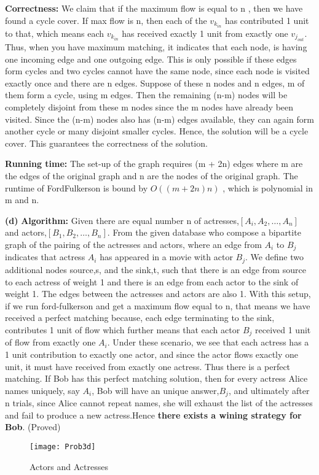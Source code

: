 \documentclass{article}
\renewcommand\part[1]{\vspace{.10in}\textbf{(#1)}}
\newcommand\algo{\vspace{.10in}\textbf{Algorithm: }}
\newcommand\correctness{\vspace{.10in}\textbf{Correctness: }}
\newcommand\runtime{\vspace{.10in}\textbf{Running time: }}
\begin{document}
  \correctness We claim that if the maximum flow is equal to n , then we have found a cycle cover. If max flow is n, then each of the $v_{k_{in}}$ has contributed 1 unit to that, which means each $v_{k_{in}}$ has received exactly 1 unit from exactly one $v_{j_{out}}$. Thus, when you have maximum matching, it indicates that each node, is having one incoming edge and one outgoing edge. This is only possible if these edges form cycles and two cycles cannot have the same node, since each node is visited exactly once and there are n edges. Suppose of these n nodes and n edges, m of them form a cycle, using m edges. Then the remaining (n-m) nodes will be completely disjoint from these m nodes since the m nodes have already been visited. Since the (n-m) nodes also has (n-m) edges available, they can again form another cycle or many disjoint smaller cycles. Hence, the solution will be a cycle cover. This guarantees the correctness of the solution. \newline

  \runtime 
  The set-up of the graph requires (m + 2n) edges where m are the edges of the original graph and n are the nodes of the original graph. The runtime of FordFulkerson is bound by $O((m+2n)n)$ , which is polynomial in m and n. \newline

  \part{d}
  \algo Given there are equal number n of actresses,$[A_i, A_2, \dots, A_n]$ and actors,$[B_1, B_2, \dots, B_n]$. From the given database who compose a bipartite graph of the pairing of the actresses and actors, where an edge from $A_i$ to $B_j$ indicates that actress $A_i$ has appeared in a movie with actor $B_j$. We define two additional nodes source,s, and the sink,t, such that there is an edge from source to each actress of weight 1 and there is an edge from each actor to the sink of weight 1. The edges between the actresses and actors are also 1. With this setup, if we run ford-fulkerson  and get a maximum flow equal to n, that means we have received a perfect matching because, each edge terminating to the sink, contributes 1 unit of flow which further means that each actor $B_j$ received 1 unit of flow from exactly one $A_i$. Under these scenario, we see that each actress has a 1 unit contribution to exactly one actor, and since the actor flows exactly one unit, it must have received from exactly one actress. Thus there is a perfect matching. If Bob has this perfect matching solution, then for every actress Alice names uniquely, say $A_i$, Bob will have an unique answer,$B_j$, and ultimately after n trials, since Alice cannot repeat names, she will exhaust the list of the actresses and fail to produce a new actress.Hence \textbf {there exists a wining strategy for Bob}. (Proved)\newline
 \begin{figure}[H]
   \centering
  \texttt{[image: Prob3d]}
  \caption{Actors and Actresses}
  \end{figure}
\end{document}
